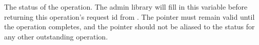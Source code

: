 The status of the operation.  The admin library will fill in this variable
before returning this operation's request id from .
The pointer must remain valid until the operation completes, and the pointer
should not be aliased to the status for any other outstanding operation.

